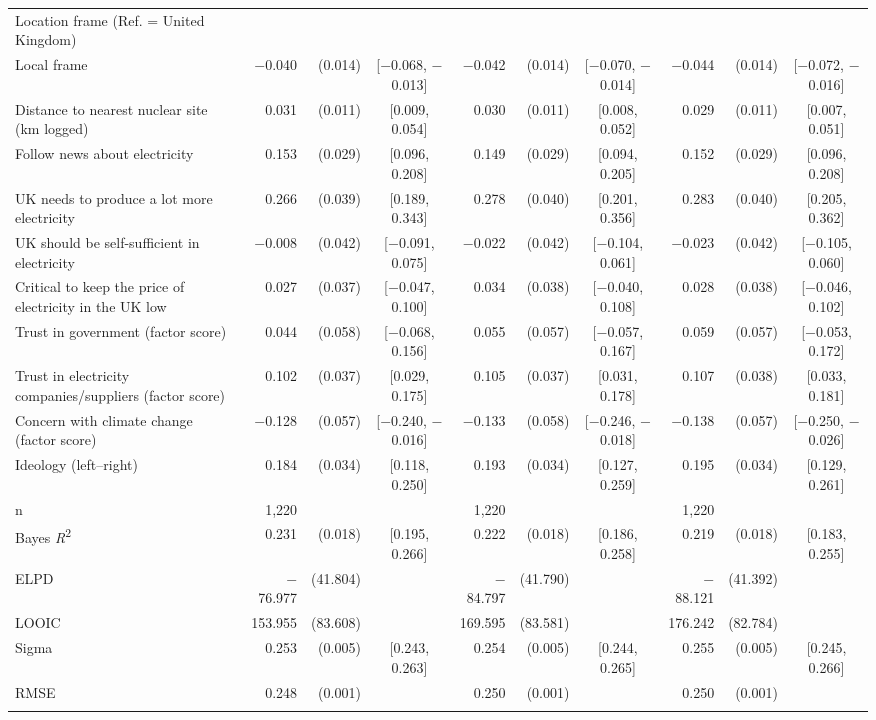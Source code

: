 \begin{landscape}
\begin{longtable}[t]{>{\raggedright\arraybackslash}p{2.8in}rrcrrcrrc}
Location frame (Ref. = United Kingdom) &  &  &  &  &  &  &  &  & \\
\hspace{1em}Local frame & $-$0.040 & (0.014) & {}[$-$0.068, $-$0.013] & $-$0.042 & (0.014) & {}[$-$0.070, $-$0.014] & $-$0.044 & (0.014) & {}[$-$0.072, $-$0.016]\\
Distance to nearest nuclear site (km logged) & 0.031 & (0.011) & {}[0.009, 0.054] & 0.030 & (0.011) & {}[0.008, 0.052] & 0.029 & (0.011) & {}[0.007, 0.051]\\
Follow news about electricity & 0.153 & (0.029) & {}[0.096, 0.208] & 0.149 & (0.029) & {}[0.094, 0.205] & 0.152 & (0.029) & {}[0.096, 0.208]\\
UK needs to produce a lot more electricity & 0.266 & (0.039) & {}[0.189, 0.343] & 0.278 & (0.040) & {}[0.201, 0.356] & 0.283 & (0.040) & {}[0.205, 0.362]\\
UK should be self-sufficient in electricity & $-$0.008 & (0.042) & {}[$-$0.091, 0.075] & $-$0.022 & (0.042) & {}[$-$0.104, 0.061] & $-$0.023 & (0.042) & {}[$-$0.105, 0.060]\\
Critical to keep the price of electricity in the UK low & 0.027 & (0.037) & {}[$-$0.047, 0.100] & 0.034 & (0.038) & {}[$-$0.040, 0.108] & 0.028 & (0.038) & {}[$-$0.046, 0.102]\\
Trust in government (factor score) & 0.044 & (0.058) & {}[$-$0.068, 0.156] & 0.055 & (0.057) & {}[$-$0.057, 0.167] & 0.059 & (0.057) & {}[$-$0.053, 0.172]\\
Trust in electricity companies/suppliers (factor score) & 0.102 & (0.037) & {}[0.029, 0.175] & 0.105 & (0.037) & {}[0.031, 0.178] & 0.107 & (0.038) & {}[0.033, 0.181]\\
Concern with climate change (factor score) & $-$0.128 & (0.057) & {}[$-$0.240, $-$0.016] & $-$0.133 & (0.058) & {}[$-$0.246, $-$0.018] & $-$0.138 & (0.057) & {}[$-$0.250, $-$0.026]\\
Ideology (left--right) & 0.184 & (0.034) & {}[0.118, 0.250] & 0.193 & (0.034) & {}[0.127, 0.259] & 0.195 & (0.034) & {}[0.129, 0.261]\\
\midrule
n & 1,220 &  &  & 1,220 &  &  & 1,220 &  & \\
Bayes \textit{R}\textsuperscript{2} & 0.231 & (0.018) & {}[0.195, 0.266] & 0.222 & (0.018) & {}[0.186, 0.258] & 0.219 & (0.018) & {}[0.183, 0.255]\\
ELPD & $-$76.977 & (41.804) &  & $-$84.797 & (41.790) &  & $-$88.121 & (41.392) & \\
LOOIC & 153.955 & (83.608) &  & 169.595 & (83.581) &  & 176.242 & (82.784) & \\
Sigma & 0.253 & (0.005) & {}[0.243, 0.263] & 0.254 & (0.005) & {}[0.244, 0.265] & 0.255 & (0.005) & {}[0.245, 0.266]\\
RMSE & 0.248 & (0.001) &  & 0.250 & (0.001) &  & 0.250 & (0.001) & \\*
\end{longtable}


\end{landscape}
